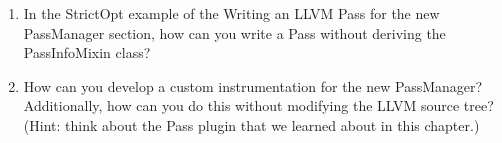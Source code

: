 
\begin{enumerate}
\item In the StrictOpt example of the Writing an LLVM Pass for the new PassManager section, how can you write a Pass without deriving the PassInfoMixin class?

\item How can you develop a custom instrumentation for the new PassManager? Additionally, how can you do this without modifying the LLVM source tree? (Hint: think about the Pass plugin that we learned about in this chapter.)

\end{enumerate}